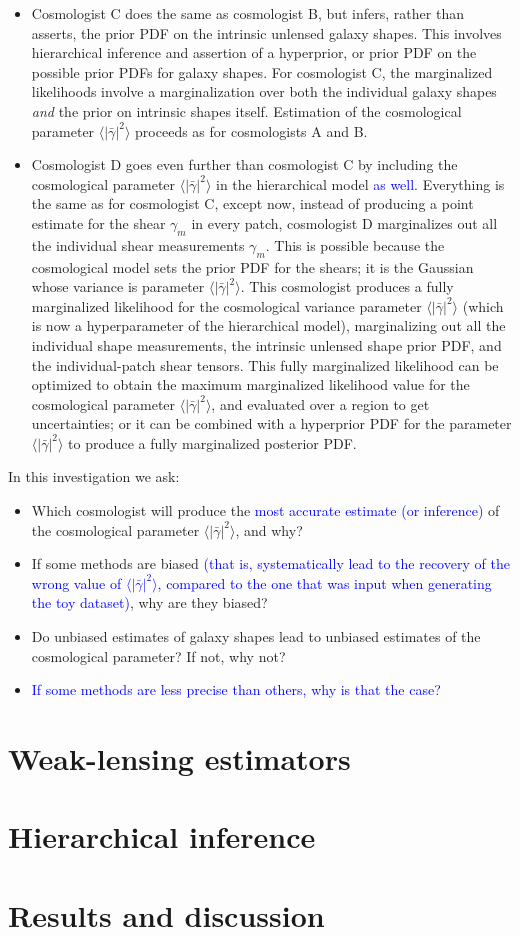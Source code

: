 \documentclass[12pt]{article}
\def\shearvar{\langle |\bar{\gamma}|^2\rangle}
\def\phil#1{\textcolor{blue}{#1}}
\begin{document}
\begin{itemize}
\item Cosmologist C does the same as cosmologist B, but infers, rather than
asserts, the prior PDF on the intrinsic unlensed galaxy shapes.  This
involves hierarchical inference and assertion of a hyperprior, or
prior PDF on the possible prior PDFs for galaxy shapes.  For
cosmologist C, the marginalized likelihoods involve a marginalization
over both the individual galaxy shapes \emph{and} the prior on
intrinsic shapes itself.  Estimation of the cosmological parameter
$\shearvar$ proceeds as for cosmologists A and B.

\item Cosmologist D goes even further than cosmologist C by including the
cosmological parameter $\shearvar$ in the hierarchical model \phil{as well.}
Everything is the same as for cosmologist C, except now, instead of
producing a point estimate for the shear $\gamma_m$ in every patch,
cosmologist D marginalizes out all the individual shear measurements
$\gamma_m$.  This is possible because the cosmological model sets the
prior PDF for the shears; it is the Gaussian whose variance is
parameter $\shearvar$.  This cosmologist produces a fully marginalized
likelihood for the cosmological variance parameter $\shearvar$ (which
is now a hyperparameter of the hierarchical model), marginalizing out
all the individual shape measurements, the intrinsic unlensed shape
prior PDF, and the individual-patch shear tensors.  This fully
marginalized likelihood can be optimized to obtain the maximum
marginalized likelihood value for the cosmological parameter
$\shearvar$, and evaluated over a region to get uncertainties; or it
can be combined with a hyperprior PDF for the parameter $\shearvar$ to
produce a fully marginalized posterior PDF.

\end{itemize}

In this investigation we ask:
\begin{itemize}
\item Which cosmologist will produce the \phil{
most accurate estimate (or inference)}
of the cosmological parameter $\shearvar$, and why? 
\item If some methods are biased \phil{(that is, systematically lead to the
recovery of the wrong value of $\shearvar$, compared to the one that was input
when generating the toy dataset)}, why are they biased?  
\item Do unbiased estimates of galaxy shapes lead to unbiased estimates of the
cosmological parameter?  If not, why not?
\item \phil{If some methods are less precise than others, why is that the 
case?}
\end{itemize}

\section{Weak-lensing estimators}

\section{Hierarchical inference}

\section{Results and discussion}
\end{document}
